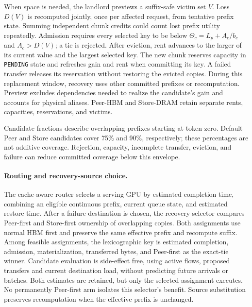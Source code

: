 When space is needed, the landlord previews a suffix-safe victim set $V$.
Loss $D(V)$ is recomputed jointly, once per affected request, from tentative
prefix state. Summing independent chunk credits could count lost prefix
utility repeatedly. Admission requires every selected key to be below
$\Theta_c=L_p+A_c/b_c$ and $A_c>D(V)$; a tie is rejected.
After eviction, rent advances to the larger of its current value and the
largest selected key. The new chunk reserves capacity in \texttt{PENDING}
state and refreshes gain and rent when committing its key. A failed transfer
releases its reservation without restoring the evicted copies. During this
replacement window, recovery uses other committed prefixes or recomputation.
Preview excludes dependencies needed to realize
the candidate's gain and accounts for physical aliases. Peer-HBM and
Store-DRAM retain separate rents, capacities, reservations, and victims.

Candidate fractions describe overlapping prefixes starting at token zero.
Default Peer and Store candidates cover 75\% and 90\%, respectively; these
percentages are not additive coverage. Rejection, capacity, incomplete transfer,
eviction, and failure can reduce committed coverage below this envelope.

\paragraph{Routing and recovery-source choice.}
The cache-aware router selects a serving GPU by estimated completion time,
combining an eligible continuous prefix, current queue state, and estimated
restore time. After a failure destination is chosen, the recovery selector
compares Peer-first and Store-first ownership of overlapping copies. Both
assignments use normal HBM first and preserve the same effective prefix and
recompute suffix. Among feasible assignments, the lexicographic key is
estimated completion, admission, materialization, transferred bytes, and
Peer-first as the exact-tie winner. Candidate evaluation is side-effect free, using active flows, proposed
transfers and current destination load, without predicting future arrivals
or batches. Both estimates are retained, but only the selected assignment
executes. No permanently Peer-first arm isolates this selector's benefit.
Source substitution preserves recomputation when the effective prefix is
unchanged.

